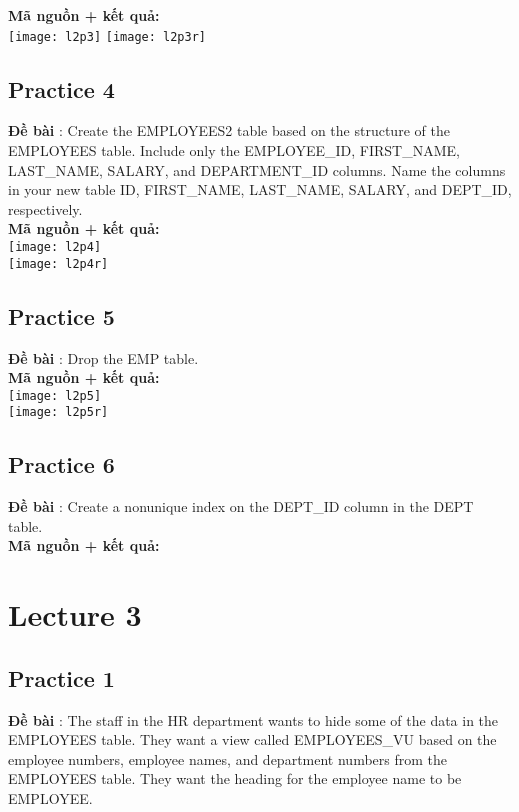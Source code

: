 \documentclass[a4paper]{report}
\begin{document}
\textbf{Mã nguồn + kết quả: }\\
\texttt{[image: l2p3]}
\texttt{[image: l2p3r]}

\subsection{Practice 4}
\noindent
\textbf{Đề bài} : Create the EMPLOYEES2 table based on the structure of the EMPLOYEES table. Include only the EMPLOYEE\_ID, FIRST\_NAME, LAST\_NAME, SALARY, and DEPARTMENT\_ID columns. Name the columns in your new table ID, FIRST\_NAME, LAST\_NAME, SALARY, and DEPT\_ID, respectively.\\

\textbf{Mã nguồn + kết quả: }\\
\texttt{[image: l2p4]}\\
\texttt{[image: l2p4r]}

\subsection{Practice 5}
\noindent
\textbf{Đề bài} : Drop the EMP table.\\

\textbf{Mã nguồn + kết quả: }\\
\texttt{[image: l2p5]}\\
\texttt{[image: l2p5r]}

\subsection{Practice 6}
\noindent
\textbf{Đề bài} : Create a nonunique index on the DEPT\_ID column in the DEPT table.\\

\textbf{Mã nguồn + kết quả: }

\section{Lecture 3}
\subsection{Practice 1}
\noindent
\textbf{Đề bài} : The staff in the HR department wants to hide some of the data in the EMPLOYEES table. They want a view called EMPLOYEES\_VU based on the employee numbers, employee names, and department numbers from the EMPLOYEES table. They want the heading for the employee name to be EMPLOYEE.\\
\end{document}

